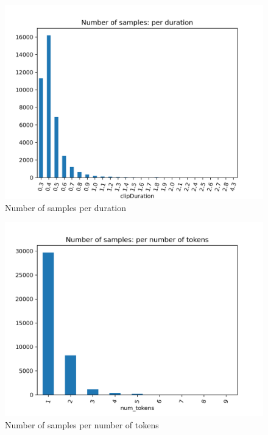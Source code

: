 \begin{figure}
  \centering
  \includegraphics[width=\textwidth]{results/targeted_triplets/num_samples_vs_duration.png}
  \caption{Number of samples per duration}
  \label{fig:num_samples_vs_duration}
\end{figure}


\begin{figure}
  \centering
  \includegraphics[width=\textwidth]{results/targeted_triplets/num_samples_vs_num_tokens.png}
  \caption{Number of samples per number of tokens}
  \label{fig:num_samples_vs_num_tokens}
\end{figure}


